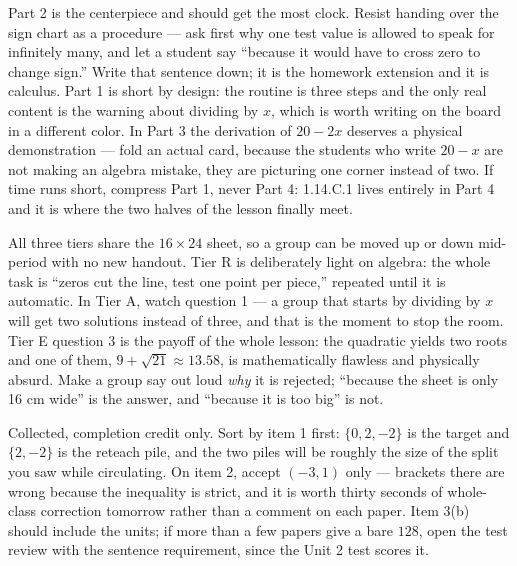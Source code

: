 \documentclass[10pt]{article}
\begin{document}
\begin{teachernote}
Part 2 is the centerpiece and should get the most clock. Resist handing over
the sign chart as a procedure --- ask first why one test value is allowed to
speak for infinitely many, and let a student say ``because it would have to
cross zero to change sign.'' Write that sentence down; it is the homework
extension and it is calculus. Part 1 is short by design: the routine is three
steps and the only real content is the warning about dividing by $x$, which is
worth writing on the board in a different color. In Part 3 the derivation of
$20 - 2x$ deserves a physical demonstration --- fold an actual card, because
the students who write $20 - x$ are not making an algebra mistake, they are
picturing one corner instead of two. If time runs short, compress Part 1, never
Part 4: 1.14.C.1 lives entirely in Part 4 and it is where the two halves of the
lesson finally meet.
\end{teachernote}

\begin{teachernote}
All three tiers share the $16 \times 24$ sheet, so a group can be moved up or
down mid-period with no new handout. Tier R is deliberately light on algebra:
the whole task is ``zeros cut the line, test one point per piece,'' repeated
until it is automatic. In Tier A, watch question 1 --- a group that starts by
dividing by $x$ will get two solutions instead of three, and that is the moment
to stop the room. Tier E question 3 is the payoff of the whole lesson: the
quadratic yields two roots and one of them, $9 + \sqrt{21} \approx 13.58$, is
mathematically flawless and physically absurd. Make a group say out loud
\textit{why} it is rejected; ``because the sheet is only 16 cm wide'' is the
answer, and ``because it is too big'' is not.
\end{teachernote}

\begin{teachernote}
Collected, completion credit only. Sort by item 1 first: $\{0, 2, -2\}$ is the
target and $\{2, -2\}$ is the reteach pile, and the two piles will be roughly
the size of the split you saw while circulating. On item 2, accept $(-3,1)$
only --- brackets there are wrong because the inequality is strict, and it is
worth thirty seconds of whole-class correction tomorrow rather than a comment
on each paper. Item 3(b) should include the units; if more than a few papers
give a bare $128$, open the test review with the sentence requirement, since
the Unit 2 test scores it.
\end{teachernote}
\end{document}
